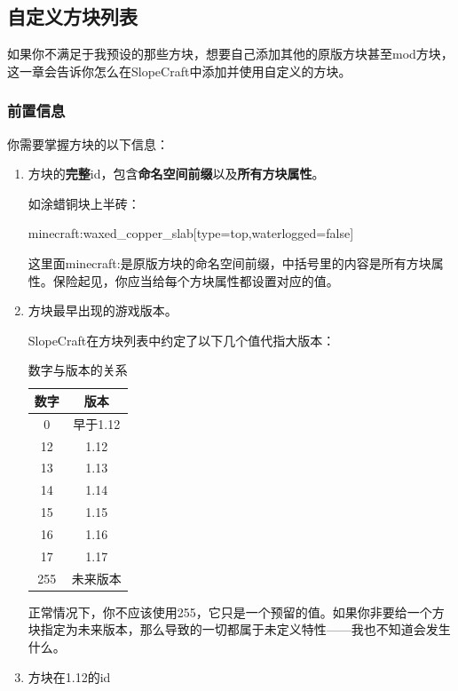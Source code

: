 \documentclass[UTF8]{ctexart}
\begin{document}
   \subsection{自定义方块列表}
   如果你不满足于我预设的那些方块，想要自己添加其他的原版方块甚至mod方块，这一章会告诉你怎么在SlopeCraft中添加并使用自定义的方块。
   
   \subsubsection{前置信息}
   你需要掌握方块的以下信息：

   \begin{enumerate}
       \item 方块的\textbf{完整}id，包含\textbf{命名空间前缀}以及\textbf{所有方块属性}。
       
       如涂蜡铜块上半砖：
       
       minecraft:waxed\_copper\_slab[type=top,waterlogged=false]

       这里面minecraft:是原版方块的命名空间前缀，中括号里的内容是所有方块属性。保险起见，你应当给每个方块属性都设置对应的值。
       \item 方块最早出现的游戏版本。
       
       SlopeCraft在方块列表中约定了以下几个值代指大版本：
       \begin{table}[h]
        \centering
        \caption{数字与版本的关系}
        \label{VerAndRealVer}
        \begin{tabular}{cc}\hline
            数字 & 版本 \\ \hline
            0 & 早于1.12 \\
            12 & 1.12 \\
            13 & 1.13 \\
            14 & 1.14 \\
            15 & 1.15 \\
            16 & 1.16 \\
            17 & 1.17 \\
            255 & 未来版本 \\
            \hline            
        \end{tabular}
       \end{table}

   正常情况下，你不应该使用255，它只是一个预留的值。如果你非要给一个方块指定为未来版本，那么导致的一切都属于未定义特性——我也不知道会发生什么。

   \item 方块在1.12的id
   

\end{enumerate}
\end{document}
